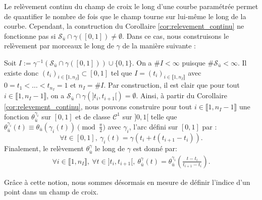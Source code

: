 Le relèvement continu du champ de croix le long d'une courbe paramétrée permet de quantifier le nombre de fois que le champ tourne sur lui-même le long de la courbe. Cependant, la construction du Corollaire \ref{cor:relevement_continu} ne fonctionne pas si $\mathcal{S}_{\bar{u}}\cap\gamma([0,1])\neq\emptyset$. Dans ce cas, nous construisons le relèvement par morceaux le long de $\gamma$ de la manière suivante :

Soit $I:=\gamma^{-1}(\mathcal{S}_{\bar{u}}\cap\gamma([0, 1]))\cup\{0, 1\}$. On a $\#I<\infty$ puisque $\#\mathcal{S}_{\bar{u}}<\infty$. Il existe donc $(t_i)_{i\in\llbracket 1, n_I\rrbracket}\subset[0,1]$ tel que $I=(t_i)_{i\in\llbracket 1, n_I\rrbracket}$ avec $0=t_1<\dots<t_{n_I}=1$ et $n_I=\#I$. Par construction, il est clair que pour tout $i\in\llbracket 1, n_I-1 \rrbracket$, on a $\mathcal{S}_{\bar{u}}\cap\gamma(]t_i, t_{i+1}[)=\emptyset$. Ainsi, à partir du Corollaire \ref{cor:relevement_continu}, nous pouvons construire pour tout $i\in\llbracket 1, n_I-1\rrbracket$ une fonction $\theta^{\gamma_i}_{\bar{u}}$ sur $[0,1]$ et de classe $\mathcal{C}^1$ sur $]0,1[$ telle que $\theta_{\bar{u}}^{\gamma_i}(t)\equiv\theta_{\bar{u}}(\gamma_i(t))\pmod{\frac{\pi}{2}}$ avec $\gamma_i$, l'arc défini sur $[0, 1]$ par :
$$
\forall t\in[0, 1],~\gamma_i(t)=\gamma(t_i+t(t_{i+1}-t_i)).
$$
Finalement, le relèvement $\theta_{\bar{u}}^\gamma$ le long de $\gamma$ est donné par:
\begin{eqnarray*}
    \forall i\in\llbracket 1, n_I\rrbracket,~\forall t\in]t_i, t_{i+1}[,~\theta_{\bar{u}}^\gamma(t)=\theta_{\bar{u}}^{\gamma_i}\left(\frac{t-t_i}{t_{i+1}-t_i}\right).
\end{eqnarray*}



Grâce à cette notion, nous sommes désormais en mesure de définir l'indice d'un point dans un champ de croix.



